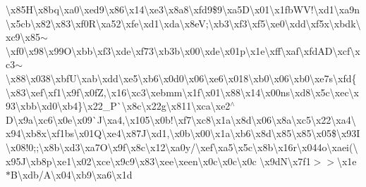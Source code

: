 \textbackslash{}x85\+H\textbackslash{}x8bq\textbackslash{}xa0\textbackslash{}xed9\textbackslash{}x86\textbackslash{}x14\textbackslash{}xe3\textbackslash{}x8a8\textbackslash{}xfd9\$9\textbackslash{}xa5\+D\textbackslash{}x01\textbackslash{}x1fb\+W\+V!\textbackslash{}xd1\textbackslash{}xa9n\textbackslash{}x5cb\textbackslash{}x82\textbackslash{}x83\textbackslash{}xf0\+R\textbackslash{}xa52\textbackslash{}xfe\textbackslash{}xd1\textbackslash{}xda\textbackslash{}x8e\+V;\textbackslash{}xb3\textbackslash{}xf3\textbackslash{}xf5\textbackslash{}xe0\textbackslash{}xdd\textbackslash{}xf5x\textbackslash{}xbdk\textbackslash{}xc9\textbackslash{}x85$\sim$\textbackslash{}xf0\textbackslash{}x98\textbackslash{}x99\+O\textbackslash{}xbb\textbackslash{}xf3\textbackslash{}xde\textbackslash{}xf73\textbackslash{}xb3b\textbackslash{}x00\textbackslash{}xde\textbackslash{}x01p\textbackslash{}x1e\textbackslash{}xff\textbackslash{}xaf\textbackslash{}xfd\+A\+D\textbackslash{}xcf\textbackslash{}xc3$\sim$\textbackslash{}x88\textbackslash{}x038\textbackslash{}xbf\+U\textbackslash{}xab\textbackslash{}xdd\textbackslash{}xe5\textbackslash{}xb6\textbackslash{}x0d0\textbackslash{}x06\textbackslash{}xe6\textbackslash{}x018\textbackslash{}xb0\textbackslash{}x06\textbackslash{}xb0\textbackslash{}xe7s\textbackslash{}xfd\{\textbackslash{}x83\textbackslash{}xef\textbackslash{}xf1\textbackslash{}x9f\textbackslash{}x0f\+Z,\textbackslash{}x16\textbackslash{}xc3\textbackslash{}xebmm\textbackslash{}x1f\textbackslash{}x01\textbackslash{}x88\textbackslash{}x14\textbackslash{}x00ns\textbackslash{}xd8\textbackslash{}x5c\textbackslash{}xec\textbackslash{}x93\textbackslash{}xbb\textbackslash{}xd0\textbackslash{}xb4\}\textbackslash{}x22\+\_\+\+P\`{}\textbackslash{}x8c\textbackslash{}x22g\textbackslash{}x811\textbackslash{}xca\textbackslash{}xe2$^\wedge$\+D\textbackslash{}x9a\textbackslash{}xc6\textbackslash{}x0e\textbackslash{}x09\`{}\+J\textbackslash{}xa4,\textbackslash{}x105\textbackslash{}x0b!\textbackslash{}xf7\textbackslash{}xc8\textbackslash{}x1a\textbackslash{}x8d\textbackslash{}x06\textbackslash{}x8a\textbackslash{}xc5\textbackslash{}x22\textbackslash{}xa4\textbackslash{}x94\textbackslash{}xb8x\textbackslash{}xf1bs\textbackslash{}x01\+Q\textbackslash{}xe4\textbackslash{}x87\+J\textbackslash{}xd1,\textbackslash{}x0b\textbackslash{}x00\textbackslash{}x1a\textbackslash{}xb6\textbackslash{}x8d\textbackslash{}x85\textbackslash{}x85\textbackslash{}x05\$\textbackslash{}x93\+I\textbackslash{}x08!0;;\textbackslash{}x8b\textbackslash{}xd3\textbackslash{}xa7\+O\textbackslash{}x9f\textbackslash{}x8c\textbackslash{}x12\textbackslash{}xa0y/\textbackslash{}xef\textbackslash{}xa5\textbackslash{}x5c\textbackslash{}x8b\textbackslash{}x16r\textbackslash{}x044o\textbackslash{}xaei(\textbackslash{}x95\+J\textbackslash{}xb8p\textbackslash{}xe1\textbackslash{}x02\textbackslash{}xce\textbackslash{}x9c9\textbackslash{}x83\textbackslash{}xee\textbackslash{}xeen\textbackslash{}x0c\textbackslash{}x0c\textbackslash{}x0c \textbackslash{}x9d\+N\textbackslash{}x7f1$>$$>$\textbackslash{}x1e$\ast$\+B\textbackslash{}xdb/\+A\textbackslash{}x04\textbackslash{}xb9\textbackslash{}xa6\textbackslash{}x1d 